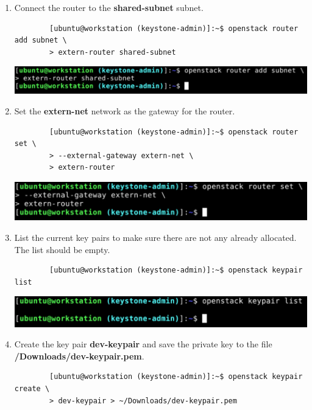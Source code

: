 \documentclass[letterpaper, 12pt]{article}
\begin{document}
\begin{enumerate}
    \item Connect the router to the \textbf{shared-subnet} subnet.
    \begin{lstlisting}
        [ubuntu@workstation (keystone-admin)]:~$ openstack router add subnet \
        > extern-router shared-subnet
    \end{lstlisting}

    \begin{center}
        \includegraphics[width=\linewidth]{images/part1/step18.png}
    \end{center}

    \item Set the \textbf{extern-net} network as the gateway for the router.
    \begin{lstlisting}
        [ubuntu@workstation (keystone-admin)]:~$ openstack router set \
        > --external-gateway extern-net \
        > extern-router
    \end{lstlisting}

    \begin{center}
        \includegraphics[width=\linewidth]{images/part1/step19.png}
    \end{center}

    \item List the current key pairs to make sure there are not any already allocated. The list should be empty.
    \begin{lstlisting}
        [ubuntu@workstation (keystone-admin)]:~$ openstack keypair list
    \end{lstlisting}

    \begin{center}
        \includegraphics[width=\linewidth]{images/part1/step20.png}
    \end{center}

    \item Create the key pair \textbf{dev-keypair} and save the private key to the file
    \textbf{\texttildemid/Downloads/dev-keypair.pem}.
    \begin{lstlisting}
        [ubuntu@workstation (keystone-admin)]:~$ openstack keypair create \
        > dev-keypair > ~/Downloads/dev-keypair.pem
    \end{lstlisting}


\end{enumerate}
\end{document}
